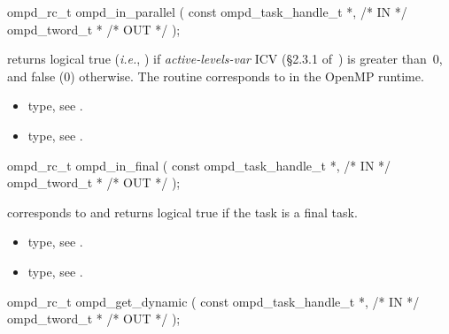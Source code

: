 \summary

\format
\cspecificstart
\begin{boxedcode}
ompd\_rc\_t ompd\_in\_parallel (
  const ompd\_task\_handle\_t  *,                           /* IN */
  ompd\_tword\_t              *                                   /* OUT */
); 
\end{boxedcode}
\cspecificend

\descr
{} returns logical true (\textit{i.e.}, )
if \emph{active-levels-var}
ICV (\S2.3.1 of~\cite{OpenMP}) is greater than~0, and false (0) otherwise.
The routine corresponds to  in the OpenMP runtime.

\argdesc

\crossreferences
\begin{itemize}
	\item {} type, see .
	\item {} type, see .
\end{itemize}


\summary

\format
\cspecificstart
\begin{boxedcode}
ompd\_rc\_t ompd\_in\_final (
  const ompd\_task\_handle\_t  *,                           /* IN */
  ompd\_tword\_t              *                                   /* OUT */
); 
\end{boxedcode}
\cspecificend

\descr
{} corresponds to  and returns
logical true if the task is a final task.

\argdesc

\crossreferences
\begin{itemize}
	\item {} type, see .
	\item {} type, see .
\end{itemize}


\summary

\format
\cspecificstart
\begin{boxedcode}
ompd\_rc\_t ompd\_get\_dynamic (
  const ompd\_task\_handle\_t  *,                           /* IN */
  ompd\_tword\_t              *                                   /* OUT */
);
\end{boxedcode}
\cspecificend

